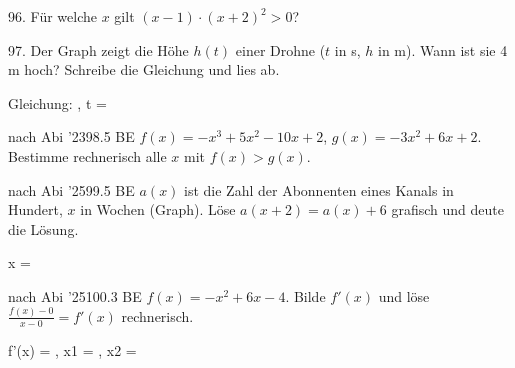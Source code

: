 \documentclass[11pt]{article}
\begin{document}
\begin{pfaufg}{}{96.}{}
Für welche $x$ gilt $(x - 1) \cdot (x + 2)^2 > 0$?
\par\noindent \leerfeld \par
{}
\end{pfaufg}
\pfgruppe{}
\begin{pfaufg}{}{97.}{}
Der Graph zeigt die Höhe $h(t)$ einer Drohne ($t$ in s, $h$ in m). Wann ist sie 4 m hoch? Schreibe die Gleichung und lies ab.
\par\smallskip\noindent \begin{ksys}[xmin=0,xmax=6,ymin=0,ymax=6,ablesen]  \end{ksys}\par
\par\noindent Gleichung: \leerfeld , t = \leerfeld \par
{}
\end{pfaufg}
\pfgruppe{}
\begin{pfaufg}{nach Abi ’23}{98.}{5 BE}
$f(x) = -x^3 + 5x^2 - 10x + 2$, $g(x) = -3x^2 + 6x + 2$. Bestimme rechnerisch alle $x$ mit $f(x) > g(x)$.
\par\noindent \leerfeld \par
{}
\end{pfaufg}
\pfgruppe{}
\begin{pfaufg}{nach Abi ’25}{99.}{5 BE}
$a(x)$ ist die Zahl der Abonnenten eines Kanals in Hundert, $x$ in Wochen (Graph). Löse $a(x + 2) = a(x) + 6$ grafisch und deute die Lösung.
\par\smallskip\noindent \begin{ksys}[xmin=0,xmax=6,ymin=0,ymax=10,ablesen]  \end{ksys}\par
\par\noindent x = \leerfeld \par
{}
\end{pfaufg}
\pfgruppe{}
\begin{pfaufg}{nach Abi ’25}{100.}{3 BE}
$f(x) = -x^2 + 6x - 4$. Bilde $f'(x)$ und löse $\tfrac{f(x) - 0}{x - 0} = f'(x)$ rechnerisch.
\par\noindent f'(x) = \leerfeld , x1 = \leerfeld , x2 = \leerfeld \par
{}
\end{pfaufg}
\pfgruppe{}
\end{document}

